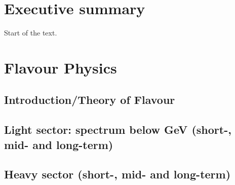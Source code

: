 \documentclass[../report.tex]{subfiles}
\providecommand{\main}{..}
\begin{document}
\chapter{Executive summary}
Start of the text.

%
%


\chapter{Flavour Physics}
\section{Introduction/Theory of Flavour}
\section{Light sector: spectrum below GeV (short-, mid- and long-term)}
\section{Heavy sector (short-, mid- and long-term)}
\end{document}

